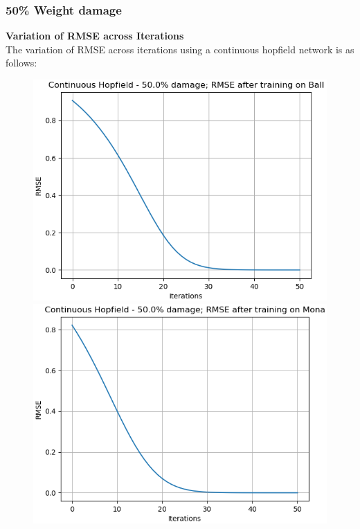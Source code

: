 \documentclass[12pt,a4paper]{article}
\begin{document}
\subsubsection{50\% Weight damage}
\textbf{Variation of RMSE across Iterations}\\
The variation of RMSE across iterations using a continuous hopfield network is as follows:
\begin{figure}[H]
\centering
\includegraphics[scale=0.4]{images/chn_50_ball.png}
\includegraphics[scale=0.4]{images/chn_50_mona.png}

\end{figure}
\end{document}
